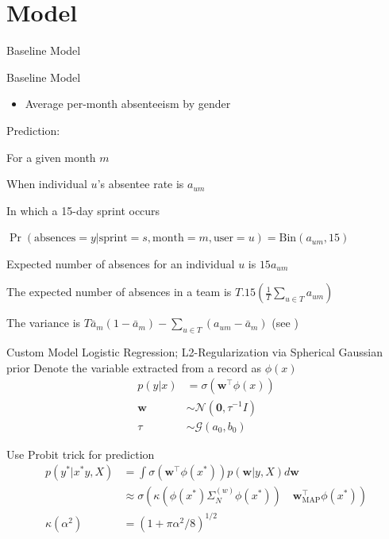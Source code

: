 \documentclass[xcolor=dvipsnames]{beamer}
\begin{document}

\section{Model}
\begin{frame}{Baseline Model}

Baseline Model
\begin{itemize}
    \item Average per-month absenteeism by gender 
\end{itemize}

 {
    Prediction:
    
    \begin{itemize}
        \item For a given month $m$
        \item When individual $u$'s absentee rate is $a_{um}$ 
        \item In which a 15-day sprint occurs   
         {
        \item $\Pr(\text{absences} = y | \text{sprint} = s, \text{month}=m, \text{user}=u) = \text{Bin}\left(a_{um}, 15 \right)$
        }
         {
        \item Expected number of absences for an individual $u$ is $15 a_{um}$
        }
         {
        \item The expected number of absences in a team is $T . 15 \left(\frac{1}{T}\sum_{u \in T} a_{um}\right)$ 
        \item The variance is $T \bar{a}_m \left(1 - \bar{a}_m\right) - \sum_{u \in T}\left(a_{um} - \bar{a}_m\right)$ (see \cite{DreznerFarnum1993})
        }
    \end{itemize}
}

\end{frame}

\begin{frame}{Custom Model}
Logistic Regression; L2-Regularization via Spherical Gaussian prior
\medskip
Denote the variable extracted from a record as $\phi(x)$
\begin{align*}
p(y|x) & = \sigma(\mathbf{w}^\top \phi(x)) \\
\mathbf{w} & \sim \mathcal{N}\left(\mathbf{0}, \tau^{-1} I\right)\\
\tau &\sim \mathcal{G}\left(a_0, b_0\right)
\end{align*}

Use Probit trick\cite{Bishop2006} for prediction
\begin{align*}
p(y^*|x^*y,X) & = \int \sigma(\mathbf{w}^\top \phi(x^*)) p(\mathbf{w} | y, X) d \mathbf{w} \\
& \approx \sigma(\kappa(\phi(x^*)\Sigma^{(w)}_{N}\phi(x^*)) \quad \mathbf{w}_{\text{MAP}}^\top \phi(x^*))\\
\kappa(\alpha^2) & = (1 + \pi \alpha^2 / 8)^{1/2}
\end{align*}

\end{frame}
\end{document}
